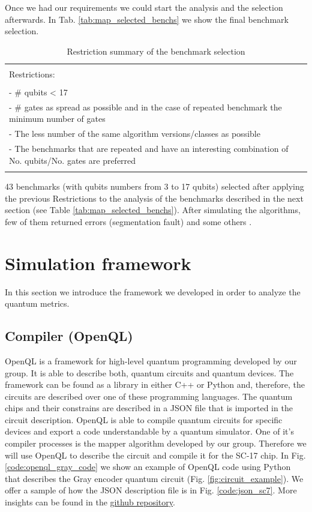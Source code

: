 Once we had our requirements we could start the analysis and the selection afterwards.
In Tab. \ref{tab:map_selected_benchs} we show the final benchmark selection.
\begin{table}[htbp]
\caption{\label{tab:orgc6ea375}
Restriction summary of the benchmark selection}
\centering
\begin{tabular}{|l|}
\hline
\\
Restrictions:\\
\\
- \# qubits < 17\\
- \# gates as spread as possible and in the case of repeated benchmark the minimum number of gates\\
- The less number of the same algorithm versions/classes as possible\\
- The benchmarks that are repeated and have an interesting combination of No. qubits/No. gates are  preferred\\
\\
\hline
\end{tabular}
\end{table}
43 benchmarks (with qubits numbers from 3 to 17 qubits) selected after applying the previous Restrictions to the analysis of the benchmarks described in the next section (see Table \ref{tab:map_selected_benchs}).
After simulating the algorithms, few of them returned errors (segmentation fault) and some others .

\section*{Simulation framework}
\label{sec:org9b2f460}
In this section we introduce the framework we developed in order to analyze the quantum metrics.

\subsection*{Compiler (OpenQL)}
\label{sec:orgc30df36}
OpenQL is a framework for high-level quantum programming developed by our group.
It is able to describe both, quantum circuits and quantum devices.
The framework can be found as a library in either C++ or Python and, therefore, the circuits are described over one of these programming languages.
The quantum chips and their constrains are described in a JSON file that is imported in the circuit description.
OpenQL is able to compile quantum circuits for specific devices and export a code understandable by a quantum simulator.
One of it's compiler processes is the mapper algorithm developed by our group.
Therefore we will use OpenQL to describe the circuit and compile it for the SC-17 chip.
In Fig. \ref{code:openql_gray_code} we show an example of OpenQL code using Python that describes the Gray encoder quantum circuit (Fig. \ref{fig:circuit_example}).
We offer a sample of how the JSON description file is in Fig. \ref{code:json_sc7}.
More insights can be found in the \href{https://github.com/QE-Lab/OpenQL}{github repository}.

